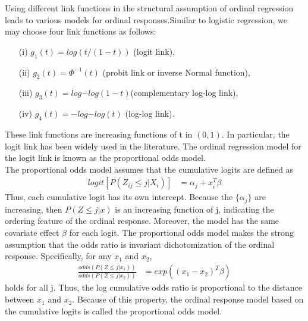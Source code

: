 \documentclass{article}
\begin{document}
\begin{itemize}
Using different link functions in the structural assumption of ordinal regression leads to various models for ordinal responses.Similar to logistic regression, we may choose four link functions as follows:
\begin{itemize}
    \item [(i)] $g_1(t) = log(t/(1-t))$ (logit link), 
    \item [(ii)] $g_2(t) = \Phi^{-1}(t)$ (probit link or inverse Normal function),
    \item [(iii)] $g_3(t) =log{-log(1- t)} $(complementary log-log link),
    \item [(iv)] $g_4(t) = -log{-log(t)}$ (log-log link). 
\end{itemize}
These link functions are increasing functions of t in $(0, 1)$. In particular, the logit link has been widely used in the literature. The ordinal
regression model for the logit link is known as the proportional odds model.\\
The proportional odds model assumes that the cumulative logits are defined as
\begin{align*}
   logit[ P(Z_{ij} \leq j | X_i)] &= \alpha_j + x_i^T\beta
\end{align*}
Thus, each cumulative logit has its own intercept. Because the $\{\alpha_j \}$ are increasing, then $P(Z \leq j|x)$ is an increasing function of j, indicating the ordering feature of the ordinal response. Moreover, the model has the same
covariate effect $\beta$ for each logit. The proportional odds model makes the strong assumption that the odds ratio is invariant dichotomization of the ordinal response. Specifically, for any $x_1$ and $x_2$,
\begin{align*}
   \frac{odds (P(Z \leq j|x_1))}{odds (P(Z \leq j|x_2))} &= exp \left( (x_1-x_2)^T\beta \right)
\end{align*}
holds for all j. Thus, the log cumulative odds ratio is proportional to the distance between $x_1$ and $x_2$. Because of this property, the ordinal response model based on the cumulative logits is called the proportional odds model.
\end{itemize}
\end{document}

